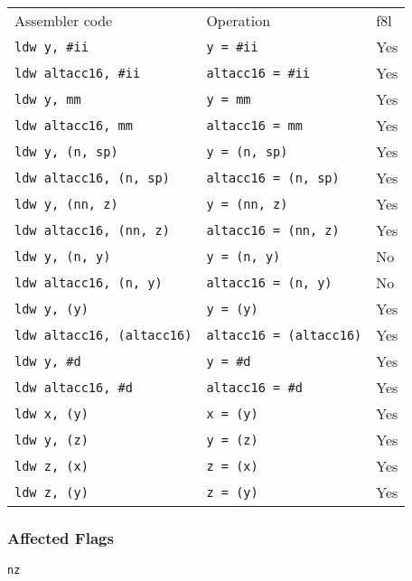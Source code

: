 \documentclass{book}
\begin{document}
\begin{tabular}{l l l}
Assembler code                    & Operation                      & f8l \\
\texttt{ldw y, \#ii}              & \texttt{y = \#ii}              & Yes \\
\texttt{ldw altacc16, \#ii}       & \texttt{altacc16 = \#ii}       & Yes \\
\texttt{ldw y, mm}                & \texttt{y = mm}                & Yes \\
\texttt{ldw altacc16, mm}         & \texttt{altacc16 = mm}         & Yes \\
\texttt{ldw y, (n, sp)}           & \texttt{y = (n, sp)}           & Yes \\
\texttt{ldw altacc16, (n, sp)}    & \texttt{altacc16 = (n, sp)}    & Yes \\
\texttt{ldw y, (nn, z)}           & \texttt{y = (nn, z)}           & Yes \\
\texttt{ldw altacc16, (nn, z)}    & \texttt{altacc16 = (nn, z)}    & Yes \\
\texttt{ldw y, (n, y)}            & \texttt{y = (n, y)}            & No \\
\texttt{ldw altacc16, (n, y)}     & \texttt{altacc16 = (n, y)}     & No \\
\texttt{ldw y, (y)}               & \texttt{y = (y)}               & Yes \\
\texttt{ldw altacc16, (altacc16)} & \texttt{altacc16 = (altacc16)} & Yes \\
\texttt{ldw y, \#d}               & \texttt{y = \#d}               & Yes \\
\texttt{ldw altacc16, \#d}        & \texttt{altacc16 = \#d}        & Yes \\
\texttt{ldw x, (y)}               & \texttt{x = (y)}               & Yes \\
\texttt{ldw y, (z)}               & \texttt{y = (z)}               & Yes \\
\texttt{ldw z, (x)}               & \texttt{z = (x)}               & Yes \\
\texttt{ldw z, (y)}               & \texttt{z = (y)}               & Yes \\
\end{tabular}

\subsubsection*{Affected Flags}

\texttt{nz}
\end{document}
